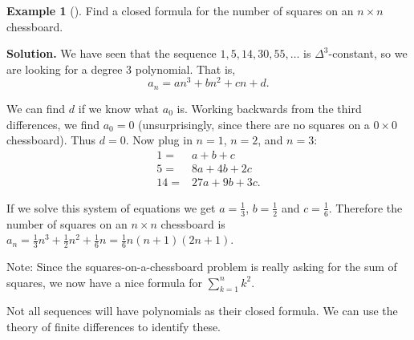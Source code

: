 \documentclass[12pt,]{book}
\theoremstyle{plain}
\theoremstyle{definition}
\theoremstyle{definition}
\newtheorem{example}[theorem]{Example}
\theoremstyle{definition}
\numberwithin{equation}{chapter}
\renewcommand{\d}{\displaystyle}
\newcommand{\amp}{&}
\begin{document}
\begin{example}[]\label{example-16}
\hypertarget{p-241}{}%
Find a closed formula for the number of squares on an \(n \times n\) chessboard.%
\par\smallskip%
\noindent\textbf{Solution.}\hypertarget{solution-27}{}\quad%
\hypertarget{p-242}{}%
We have seen that the sequence \(1, 5, 14, 30, 55, \ldots\) is \(\Delta^3\)-constant, so we are looking for a degree 3 polynomial. That is,%
\begin{equation*}
a_n = an^3 + bn^2 + cn + d.
\end{equation*}
%
\par
\hypertarget{p-243}{}%
We can find \(d\) if we know what \(a_0\) is. Working backwards from the third differences, we find \(a_0 = 0\) (unsurprisingly, since there are no squares on a \(0\times 0\) chessboard). Thus \(d = 0\). Now plug in \(n = 1\), \(n =2\), and \(n =3\):%
\begin{align*}
1 = \amp a + b + c\\
5 = \amp 8a + 4b + 2c\\
14 = \amp 27a + 9b + 3c.
\end{align*}
%
\par
\hypertarget{p-244}{}%
If we solve this system of equations we get \(a = \frac{1}{3}\), \(b = \frac{1}{2}\) and \(c = \frac{1}{6}\). Therefore the number of squares on an \(n \times n\) chessboard is \(a_n = \frac{1}{3}n^3 + \frac{1}{2}n^2 + \frac{1}{6}n = \frac{1}{6}n(n+1)(2n+1)\).%
\end{example}
\hypertarget{p-245}{}%
Note: Since the squares-on-a-chessboard problem is really asking for the sum of squares, we now have a nice formula for \(\d\sum_{k=1}^n k^2\).%
\par
\hypertarget{p-246}{}%
Not all sequences will have polynomials as their closed formula. We can use the theory of finite differences to identify these.%
\end{document}
